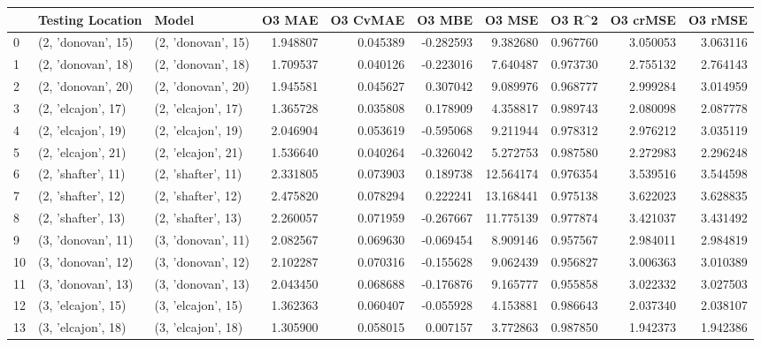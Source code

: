 \begin{tabular}{lllrrrrrrr}
\toprule
{} &    Testing Location &               Model &    O3 MAE &  O3 CvMAE &    O3 MBE &     O3 MSE &    O3 R\textasciicircum2 &  O3 crMSE &   O3 rMSE \\
\midrule
0  &  (2, 'donovan', 15) &  (2, 'donovan', 15) &  1.948807 &  0.045389 & -0.282593 &   9.382680 &  0.967760 &  3.050053 &  3.063116 \\
1  &  (2, 'donovan', 18) &  (2, 'donovan', 18) &  1.709537 &  0.040126 & -0.223016 &   7.640487 &  0.973730 &  2.755132 &  2.764143 \\
2  &  (2, 'donovan', 20) &  (2, 'donovan', 20) &  1.945581 &  0.045627 &  0.307042 &   9.089976 &  0.968777 &  2.999284 &  3.014959 \\
3  &  (2, 'elcajon', 17) &  (2, 'elcajon', 17) &  1.365728 &  0.035808 &  0.178909 &   4.358817 &  0.989743 &  2.080098 &  2.087778 \\
4  &  (2, 'elcajon', 19) &  (2, 'elcajon', 19) &  2.046904 &  0.053619 & -0.595068 &   9.211944 &  0.978312 &  2.976212 &  3.035119 \\
5  &  (2, 'elcajon', 21) &  (2, 'elcajon', 21) &  1.536640 &  0.040264 & -0.326042 &   5.272753 &  0.987580 &  2.272983 &  2.296248 \\
6  &  (2, 'shafter', 11) &  (2, 'shafter', 11) &  2.331805 &  0.073903 &  0.189738 &  12.564174 &  0.976354 &  3.539516 &  3.544598 \\
7  &  (2, 'shafter', 12) &  (2, 'shafter', 12) &  2.475820 &  0.078294 &  0.222241 &  13.168441 &  0.975138 &  3.622023 &  3.628835 \\
8  &  (2, 'shafter', 13) &  (2, 'shafter', 13) &  2.260057 &  0.071959 & -0.267667 &  11.775139 &  0.977874 &  3.421037 &  3.431492 \\
9  &  (3, 'donovan', 11) &  (3, 'donovan', 11) &  2.082567 &  0.069630 & -0.069454 &   8.909146 &  0.957567 &  2.984011 &  2.984819 \\
10 &  (3, 'donovan', 12) &  (3, 'donovan', 12) &  2.102287 &  0.070316 & -0.155628 &   9.062439 &  0.956827 &  3.006363 &  3.010389 \\
11 &  (3, 'donovan', 13) &  (3, 'donovan', 13) &  2.043450 &  0.068688 & -0.176876 &   9.165777 &  0.955858 &  3.022332 &  3.027503 \\
12 &  (3, 'elcajon', 15) &  (3, 'elcajon', 15) &  1.362363 &  0.060407 & -0.055928 &   4.153881 &  0.986643 &  2.037340 &  2.038107 \\
13 &  (3, 'elcajon', 18) &  (3, 'elcajon', 18) &  1.305900 &  0.058015 &  0.007157 &   3.772863 &  0.987850 &  1.942373 &  1.942386 \\

\end{tabular}
